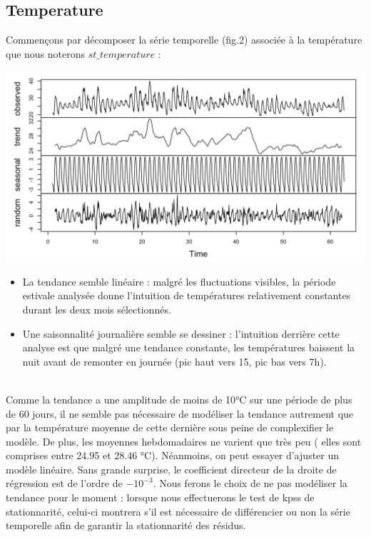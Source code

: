 \documentclass{article}
\theoremstyle{definition}
\theoremstyle{remark}
\begin{document}
\subsection{Temperature}
Commençons par décomposer la série temporelle (fig.2) associée à la température que nous noterons $st\_temperature$ :
\FloatBarrier
\begin{minipage}{.5\textwidth}
\hspace{-1cm}
\includegraphics[width=0.95\linewidth]{fig2.png}
    \label{fig:enter-label}
\end{minipage}
\begin{minipage}{.5\textwidth}
    \begin{itemize}
    \item La tendance semble linéaire : malgré les fluctuations visibles, la période estivale analysée donne l'intuition de températures relativement constantes durant les deux mois sélectionnés.  
    \item Une saisonnalité journalière semble se dessiner : l'intuition derrière cette analyse est que malgré une tendance constante, les températures baissent la nuit avant de remonter en journée (pic haut vers 15, pic bas vers 7h).
    \end{itemize}
\end{minipage}
\newline
\\
Comme la tendance a une amplitude de moins de 10°C sur une période de plus de 60 jours, il ne semble pas nécessaire de modéliser la tendance autrement que par la température moyenne de cette dernière sous peine de complexifier le modèle. De plus, les moyennes hebdomadaires ne varient que très peu ( elles sont comprises entre 24.95 et 28.46 °C). Néanmoins, on peut essayer d'ajuster un modèle linéaire. Sans grande surprise, le coefficient directeur de la droite de régression est de l'ordre de $-10^{-3}$. Nous ferons le choix de ne pas modéliser la tendance pour le moment : lorsque nous effectuerons le test de kpss de stationnarité, celui-ci montrera s'il est nécessaire de différencier ou non la série temporelle afin de garantir la stationnarité des résidus.
\end{document}
